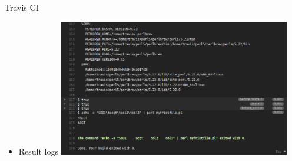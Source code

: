 \begin{frame}[fragile]{Travis CI}
  \begin{itemize}
  \item Result logs
    \includegraphics[width=0.8\textwidth]{images/hosting_services_use_case_11.png}
  \end{itemize}
\end{frame}


